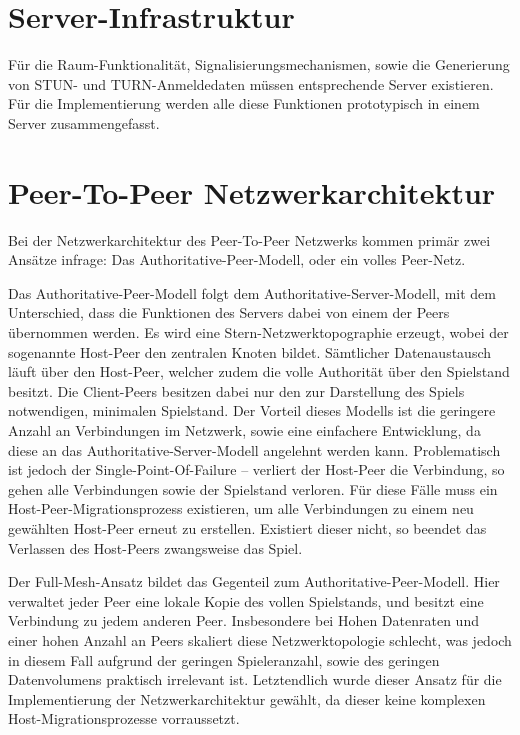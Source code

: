 \section{Server-Infrastruktur}
Für die Raum-Funktionalität, Signalisierungsmechanismen, sowie die Generierung von STUN- und TURN-Anmeldedaten müssen entsprechende Server existieren. Für die Implementierung werden alle diese Funktionen prototypisch in einem Server zusammengefasst.

\section{Peer-To-Peer Netzwerkarchitektur}
Bei der Netzwerkarchitektur des Peer-To-Peer Netzwerks kommen primär zwei Ansätze infrage: Das Authoritative-Peer-Modell, oder ein volles Peer-Netz.\par 

Das Authoritative-Peer-Modell folgt dem Authoritative-Server-Modell, mit dem Unterschied, dass die Funktionen des Servers dabei von einem der Peers übernommen werden. Es wird eine Stern-Netzwerktopographie erzeugt, wobei der sogenannte \glqq{}Host-Peer\grqq{} den zentralen Knoten bildet. Sämtlicher Datenaustausch läuft über den Host-Peer, welcher zudem die volle Authorität über den Spielstand besitzt. Die Client-Peers besitzen dabei nur den zur Darstellung des Spiels notwendigen, minimalen Spielstand. Der Vorteil dieses Modells ist die geringere Anzahl an Verbindungen im Netzwerk, sowie eine einfachere Entwicklung, da diese an das Authoritative-Server-Modell angelehnt werden kann. Problematisch ist jedoch der Single-Point-Of-Failure -- verliert der Host-Peer die Verbindung, so gehen alle Verbindungen sowie der Spielstand verloren. Für diese Fälle muss ein \glqq{}Host-Peer-Migrationsprozess\grqq{} existieren, um alle Verbindungen zu einem neu gewählten Host-Peer erneut zu erstellen. Existiert dieser nicht, so beendet das Verlassen des Host-Peers zwangsweise das Spiel.\par

Der Full-Mesh-Ansatz bildet das Gegenteil zum Authoritative-Peer-Modell. Hier verwaltet jeder Peer eine lokale Kopie des vollen Spielstands, und besitzt eine Verbindung zu jedem anderen Peer. Insbesondere bei Hohen Datenraten und einer hohen Anzahl an Peers skaliert diese Netzwerktopologie schlecht, was jedoch in diesem Fall aufgrund der geringen Spieleranzahl, sowie des geringen Datenvolumens praktisch irrelevant ist. Letztendlich wurde dieser Ansatz für die Implementierung der Netzwerkarchitektur gewählt, da dieser keine komplexen Host-Migrationsprozesse vorraussetzt.\par

